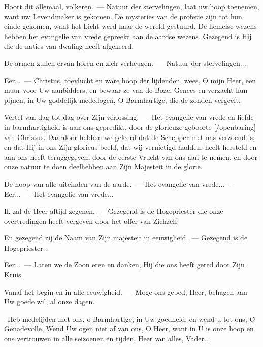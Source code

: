 \documentclass[12pt,twoside,a5paper]{article}
\begin{document}
\begin{halfparskip}
  Hoort dit allemaal, volkeren.~--- Natuur der stervelingen, laat uw hoop toenemen, want uw Levendmaker is gekomen. De mysteries van de profetie zijn tot hun einde gekomen, want het Licht werd naar de wereld gestuurd. De hemelse wezens hebben het evangelie van vrede gepreekt aan de aardse wezens. Gezegend is Hij die de naties van dwaling heeft afgekeerd.

  De armen zullen ervan horen en zich verheugen.~--- Natuur der stervelingen...

  Eer...~--- Christus, toevlucht en ware hoop der lijdenden, wees, O mijn Heer, een muur voor Uw aanbidders, en bewaar ze van de Boze. Genees en verzacht hun pijnen, in Uw goddelijk mededogen, O Barmhartige, die de zonden vergeeft.
\end{halfparskip}


\begin{halfparskip}
  Vertel van dag tot dag over Zijn verlossing.~--- Het evangelie van vrede en liefde in barmhartigheid is aan ons gepredikt, door de glorieuze geboorte [/openbaring] van Christus. Daardoor hebben we geleerd dat de Schepper met ons verzoend is; en dat Hij in ons Zijn glorieus beeld, dat wij vernietigd hadden, heeft hersteld en aan ons heeft teruggegeven, door de eerste Vrucht van ons aan te nemen, en door onze natuur te doen deelhebben aan Zijn Majesteit in de glorie.

  De hoop van alle uiteinden van de aarde.~--- Het evangelie van vrede...~--- Eer...~--- Het evangelie van vrede...
\end{halfparskip}


\begin{halfparskip}
  Ik zal de Heer altijd zegenen.~--- Gezegend is de Hogepriester die onze overtredingen heeft vergeven door het offer van Zichzelf.

  En gezegend zij de Naam van Zijn majesteit in eeuwigheid.~--- Gezegend is de Hogepriester...

  Eer...~--- Laten we de Zoon eren en danken, Hij die ons heeft gered door Zijn Kruis.

  Vanaf het begin en in alle eeuwigheid.~--- Moge ons gebed, Heer, behagen aan Uw goede wil, al onze dagen.
\end{halfparskip}

\begin{halfparskip}
   \cc~Heb medelijden met ons, o Barmhartige, in Uw goedheid, en wend u tot ons, O Genadevolle. Wend Uw ogen niet af van ons, O Heer, want in U is onze hoop en ons vertrouwen in alle seizoenen en tijden, Heer van alles, Vader...
\end{halfparskip}
\end{document}
